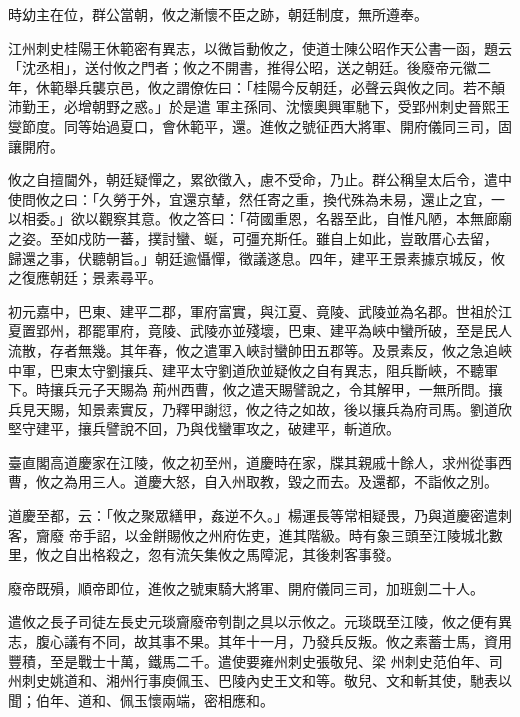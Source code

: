 \begin{pinyinscope}
 時幼主在位，群公當朝，攸之漸懷不臣之跡，朝廷制度，無所遵奉。



 江州刺史桂陽王休範密有異志，以微旨動攸之，使道士陳公昭作天公書一函，題云「沈丞相」，送付攸之門者；攸之不開書，推得公昭，送之朝廷。後廢帝元徽二年，休範舉兵襲京邑，攸之謂僚佐曰：「桂陽今反朝廷，必聲云與攸之同。若不顛沛勤王，必增朝野之惑。」於是遣
 軍主孫同、沈懷奧興軍馳下，受郢州刺史晉熙王燮節度。同等始過夏口，會休範平，還。進攸之號征西大將軍、開府儀同三司，固讓開府。



 攸之自擅閫外，朝廷疑憚之，累欲徵入，慮不受命，乃止。群公稱皇太后令，遣中使問攸之曰：「久勞于外，宜還京輦，然任寄之重，換代殊為未易，還止之宜，一以相委。」欲以觀察其意。攸之答曰：「荷國重恩，名器至此，自惟凡陋，本無廊廟之姿。至如戍防一蕃，撲討蠻、蜒，可彊充斯任。雖自上如此，豈敢厝心去留，
 歸還之事，伏聽朝旨。」朝廷逾懾憚，徵議遂息。四年，建平王景素據京城反，攸之復應朝廷；景素尋平。



 初元嘉中，巴東、建平二郡，軍府富實，與江夏、竟陵、武陵並為名郡。世祖於江夏置郢州，郡罷軍府，竟陵、武陵亦並殘壞，巴東、建平為峽中蠻所破，至是民人流散，存者無幾。其年春，攸之遣軍入峽討蠻帥田五郡等。及景素反，攸之急追峽中軍，巴東太守劉攘兵、建平太守劉道欣並疑攸之自有異志，阻兵斷峽，不聽軍下。時攘兵元子天賜為
 荊州西曹，攸之遣天賜譬說之，令其解甲，一無所問。攘兵見天賜，知景素實反，乃釋甲謝愆，攸之待之如故，後以攘兵為府司馬。劉道欣堅守建平，攘兵譬說不回，乃與伐蠻軍攻之，破建平，斬道欣。



 臺直閣高道慶家在江陵，攸之初至州，道慶時在家，牒其親戚十餘人，求州從事西曹，攸之為用三人。道慶大怒，自入州取教，毀之而去。及還都，不詣攸之別。



 道慶至都，云：「攸之聚眾繕甲，姦逆不久。」楊運長等常相疑畏，乃與道慶密遣刺客，齎廢
 帝手詔，以金餅賜攸之州府佐吏，進其階級。時有象三頭至江陵城北數里，攸之自出格殺之，忽有流矢集攸之馬障泥，其後刺客事發。



 廢帝既殞，順帝即位，進攸之號東騎大將軍、開府儀同三司，加班劍二十人。



 遣攸之長子司徒左長史元琰齎廢帝刳剒之具以示攸之。元琰既至江陵，攸之便有異志，腹心議有不同，故其事不果。其年十一月，乃發兵反叛。攸之素蓄士馬，資用豐積，至是戰士十萬，鐵馬二千。遣使要雍州刺史張敬兒、梁
 州刺史范伯年、司州刺史姚道和、湘州行事庾佩玉、巴陵內史王文和等。敬兒、文和斬其使，馳表以聞；伯年、道和、佩玉懷兩端，密相應和。




\end{pinyinscope}
